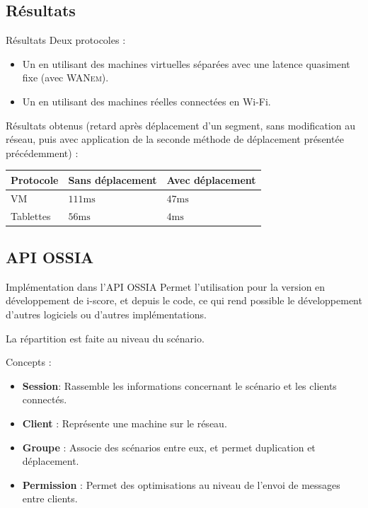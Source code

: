 \subsection{Résultats}
\begin{frame}{Résultats}
	Deux protocoles : 
	
	\begin{itemize}
		\item Un en utilisant des machines virtuelles séparées avec une latence quasiment fixe (avec \textsc{WANem}).
		\item Un en utilisant des machines réelles connectées en Wi-Fi.
	\end{itemize}
	
	Résultats obtenus (retard après déplacement d'un segment, sans modification au réseau, puis avec application de la seconde méthode de déplacement présentée précédemment) :
	
	\begin{table}[H]
		\centering
		\tabulinesep=3pt
		\begin{tabu} to \linewidth {XXX}
			Protocole & Sans déplacement & Avec déplacement \\
			\toprule[0.15em]
			VM & $\num{111}\si{\milli\second}$ & $\num{47}\si{\milli\second}$ \\
			Tablettes & $\num{56}\si{\milli\second}$ & $\num{4}\si{\milli\second}$ \\
		\end{tabu}
	\end{table}
	
\end{frame}

\subsection{API OSSIA}
\begin{frame}{Implémentation dans l'API OSSIA}
	Permet l'utilisation pour la version en développement de i-score, et depuis le code, ce qui rend possible le développement d'autres logiciels ou d'autres implémentations.
	
	La répartition est faite au niveau du scénario.
	
	Concepts : 
	\begin{itemize}
		\item \textbf{Session}: Rassemble les informations concernant le scénario et les clients connectés. 
		\item \textbf{Client} :  Représente une machine sur le réseau.
		\item \textbf{Groupe} :  Associe des scénarios entre eux, et permet duplication et déplacement.
		\item \textbf{Permission} :  
		Permet des optimisations au niveau de l'envoi de messages entre clients.
	\end{itemize}
\end{frame}


